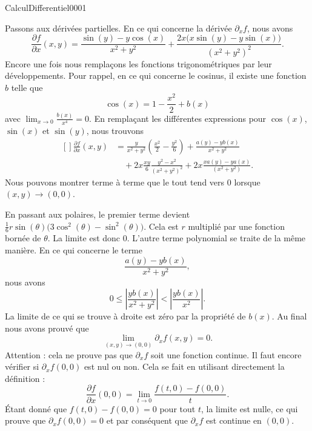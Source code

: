 \begin{corrige}{CalculDifferentiel0001}
\begin{enumerate}
			Passons aux dérivées partielles. En ce qui concerne la dérivée $\partial_xf$, nous avons
			\begin{equation}
				\frac{ \partial f }{ \partial x }(x,y)=\frac{ \sin(y)-y\cos(x) }{ x^2+y^2 }+\frac{ 2x\big( x\sin(y)-y\sin(x) \big) }{ (x^2+y^2)^2 }.
			\end{equation}
			Encore une fois nous remplaçons les fonctions trigonométriques par leur développements. Pour rappel, en ce qui concerne le cosinus, il existe une fonction $b$ telle que
			\begin{equation}
				\cos(x)=1-\frac{ x^2 }{2}+b(x)
			\end{equation}
			avec $\lim_{x\to 0} \frac{ b(x) }{ x^4 }=0$. En remplaçant les différentes expressions pour $\cos(x)$, $\sin(x)$ et $\sin(y)$, nous trouvons
			\begin{equation}
				\begin{aligned}[]
					\frac{ \partial f }{ \partial x }(x,y)&=\frac{ y }{ x^2+y^2 }\left( \frac{ x^2 }{ 2 }-\frac{ y^2 }{ 6 } \right)+\frac{ a(y)-yb(x) }{ x^2+y^2 }\\
					&\quad+2x\frac{ xy }{ 6 }\frac{ y^2-x^2 }{ (x^2+y^2)^2 }+2x\frac{ xa(y)-ya(x) }{ (x^2+y^2) }.
				\end{aligned}
			\end{equation}
			Nous pouvons montrer terme à terme que le tout tend vers $0$ lorsque $(x,y)\to (0,0)$.

			En passant aux polaires, le premier terme devient $\frac{1}{ 6 }r\sin(\theta)\big( 3\cos^2(\theta)-\sin^2(\theta) \big)$. Cela est $r$ multiplié par une fonction bornée de $\theta$. La limite est donc $0$. L'autre terme polynomial se traite de la même manière. En ce qui concerne le terme
			\begin{equation}
				\frac{ a(y)-yb(x) }{ x^2+y^2 },
			\end{equation}
			nous avons
			\begin{equation}
				0\leq\left| \frac{ yb(x) }{ x^2+y^2 } \right| <\left| \frac{ yb(x) }{ x^2 } \right| .
			\end{equation}
			La limite de ce qui se trouve à droite est zéro par la propriété de $b(x)$. Au final nous avons prouvé que
			\begin{equation}
				\lim_{(x,y)\to(0,0)}\partial_xf(x,y)=0.
			\end{equation}
			Attention : cela ne prouve pas que $\partial_xf$ soit une fonction continue. Il faut encore vérifier si $\partial_xf(0,0)$ est nul ou non. Cela se fait en utilisant directement la définition :
			\begin{equation}
				\frac{ \partial f }{ \partial x }(0,0)=\lim_{t\to 0} \frac{ f(t,0)-f(0,0) }{ t }.
			\end{equation}
			Étant donné que $f(t,0)-f(0,0)=0$ pour tout $t$, la limite est nulle, ce qui prouve que $\partial_xf(0,0)=0$ et par conséquent que $\partial_xf$ est continue en $(0,0)$.


\end{enumerate}
\end{corrige}

